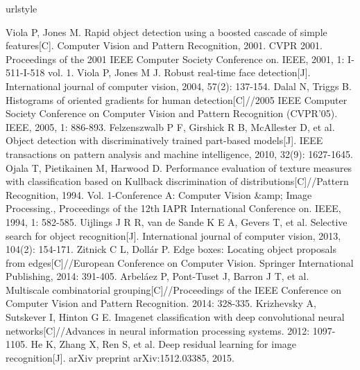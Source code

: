 
% 
%
%
\begin{thebibliography}{148}
\providecommand{\natexlab}[1]{#1}
\providecommand{\url}[1]{\texttt{#1}}
\expandafter\ifx\csname urlstyle\endcsname\relax
\providecommand{\doi}[1]{doi: #1}\else
\providecommand{\doi}{doi: \begingroup \urlstyle{rm}\Url}\fi



Viola P, Jones M. Rapid object detection using a boosted cascade of simple features[C]. Computer Vision and Pattern Recognition, 2001. CVPR 2001. Proceedings of the 2001 IEEE Computer Society Conference on. IEEE, 2001, 1: I-511-I-518 vol. 1.
Viola P, Jones M J. Robust real-time face detection[J]. International journal of computer vision, 2004, 57(2): 137-154.
Dalal N, Triggs B. Histograms of oriented gradients for human detection[C]//2005 IEEE Computer Society Conference on Computer Vision and Pattern Recognition (CVPR'05). IEEE, 2005, 1: 886-893.
Felzenszwalb P F, Girshick R B, McAllester D, et al. Object detection with discriminatively trained part-based models[J]. IEEE transactions on pattern analysis and machine intelligence, 2010, 32(9): 1627-1645.
Ojala T, Pietikainen M, Harwood D. Performance evaluation of texture measures with classification based on Kullback discrimination of distributions[C]//Pattern Recognition, 1994. Vol. 1-Conference A: Computer Vision \&amp; Image Processing., Proceedings of the 12th IAPR International Conference on. IEEE, 1994, 1: 582-585.
Uijlings J R R, van de Sande K E A, Gevers T, et al. Selective search for object recognition[J]. International journal of computer vision, 2013, 104(2): 154-171.
Zitnick C L, Dollár P. Edge boxes: Locating object proposals from edges[C]//European Conference on Computer Vision. Springer International Publishing, 2014: 391-405.
Arbeláez P, Pont-Tuset J, Barron J T, et al. Multiscale combinatorial grouping[C]//Proceedings of the IEEE Conference on Computer Vision and Pattern Recognition. 2014: 328-335.
Krizhevsky A, Sutskever I, Hinton G E. Imagenet classification with deep convolutional neural networks[C]//Advances in neural information processing systems. 2012: 1097-1105.
He K, Zhang X, Ren S, et al. Deep residual learning for image recognition[J]. arXiv preprint arXiv:1512.03385, 2015.

\end{thebibliography}
